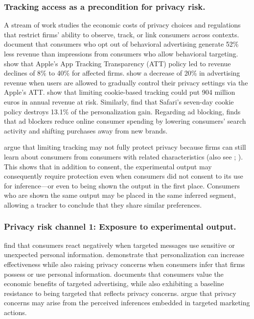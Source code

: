 \documentclass[mksc,nonblindrev]{informs3}
\begin{document}
\subsubsection{Tracking access as a precondition for privacy risk.}
A stream of work studies the economic costs of privacy choices and regulations that restrict firms' ability to observe, track, or link consumers across contexts. \citet{Johnson_2020} document that consumers who opt out of behavioral advertising generate 52\% less revenue than impressions from consumers who allow behavioral targeting. \citet{Aridor_Che_Hollenbeck_Kaiser_McCarthy_2024} show that Apple's App Tracking Transparency (ATT) policy led to revenue declines of 8\% to 40\% for affected firms. \cite{Kraft2023Economic} show a decrease of 20\% in advertising revenue when users are allowed to gradually control their privacy settings via the Apple's ATT. \citet{MILLER2024241} show that limiting cookie-based tracking could put 904 million euros in annual revenue at risk. Similarly, \citet{Korganbekova_Zuber_2024} find that Safari’s seven-day cookie policy destroys 13.1\% of the personalization gain. Regarding ad blocking, \citet{Todri_2022} finds that ad blockers reduce online consumer spending by lowering consumers' search activity and shifting purchases away from new brands.


\citet{Korganbekova_Zuber_2024} argue that limiting tracking may not fully protect privacy because firms can still learn about consumers from consumers with related characteristics (also see \cite{Wernerfelt_2025}; \cite{Aguiar_Peukert_Schafer_Ullrich_2026}). This shows that in addition to consent, the experimental output may consequently require protection even when consumers did not consent to its use for inference—or even to being shown the output in the first place. Consumers who are shown the same output may be placed in the same inferred segment, allowing a tracker to conclude that they share similar preferences. 

\subsubsection{Privacy risk channel 1: Exposure to experimental output.}
\citet{Summers_2016} find that consumers react negatively when targeted messages use sensitive or unexpected personal information. \citet{Kim_2018} demonstrate that personalization can increase effectiveness while also raising privacy concerns when consumers infer that firms possess or use personal information. \citet{Lin_2022} documents that consumers value the economic benefits of targeted advertising, while also exhibiting a baseline resistance to being targeted that reflects privacy concerns. \citet{Jerath_Miller_2024} argue that privacy concerns may arise from the perceived inferences embedded in targeted marketing actions. 
\end{document}
